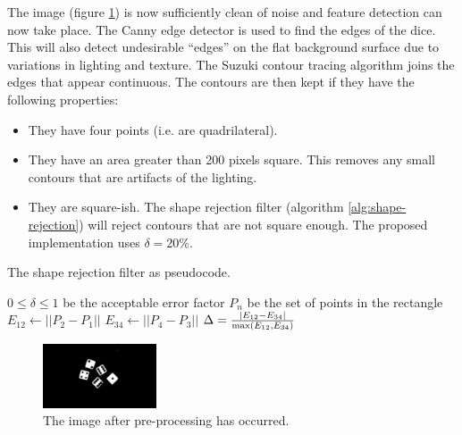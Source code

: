 \documentclass[conference]{IEEEtran}
\begin{document}
The image (figure \ref{fig:blurred}) is now sufficiently clean of noise and feature detection can now take place.
The Canny edge detector \cite{Canny1986} is used to find the edges of the dice.
This will also detect undesirable ``edges'' on the flat background surface due to variations in lighting and texture.
The Suzuki contour tracing algorithm \cite{Suzuki1985} joins the edges that appear continuous.
The contours are then kept if they have the following properties:
\begin{itemize}
	\item They have four points (i.e. are quadrilateral).
	\item They have an area greater than 200 pixels square. This removes any small contours that are artifacts of the lighting.
	\item They are square-ish. The shape rejection filter (algorithm \ref{alg:shape-rejection}) will reject contours that are not square enough. The proposed implementation uses $\delta = 20\%$.
\end{itemize}
\begin{algorithm}
	\caption{The shape rejection filter as pseudocode.}
	\label{alg:shape-rejection}
	\begin{algorithmic}
		\REQUIRE $0 \leq \delta \leq 1$ be the acceptable error factor
		\REQUIRE $P_n$ be the set of points in the rectangle
		\STATE $E_{12} \leftarrow ||P_2 - P_1||$
		\STATE $E_{34} \leftarrow ||P_4 - P_3||$
		\STATE $\Delta = \frac{|E_{12} - E_{34}|}{\textnormal{max}(E_{12}, E_{34})}$
		\IF {$\Delta \leq \delta$} \RETURN \TRUE \ELSE \RETURN \FALSE \ENDIF
	\end{algorithmic}
\end{algorithm}
\begin{figure}
	\centering
	\includegraphics[width=0.3\textwidth]{blur}
	\caption{The image after pre-processing has occurred.}
	\label{fig:blurred}
\end{figure}
%		
%
\end{document}
